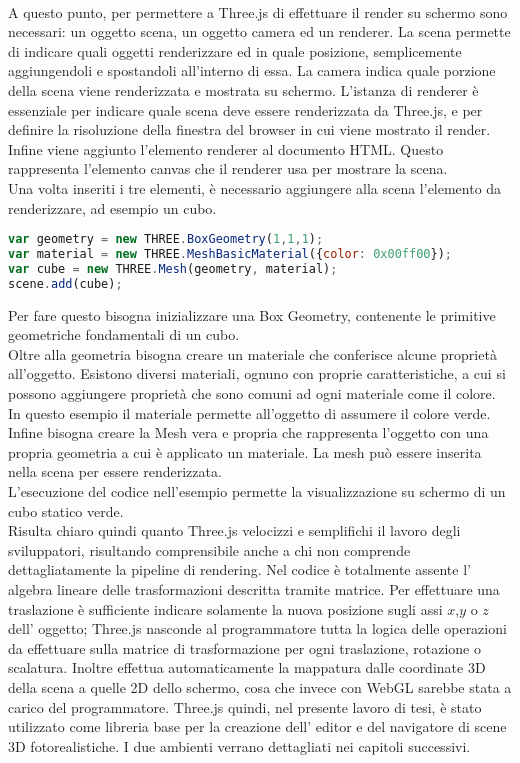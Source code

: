 \\
A questo punto, per permettere a Three.js di effettuare il render su schermo sono necessari: un oggetto scena, un oggetto camera ed un renderer.
La scena permette di indicare quali oggetti renderizzare ed in quale posizione, semplicemente aggiungendoli e spostandoli all’interno di essa.
La camera indica quale porzione della scena viene renderizzata e mostrata su schermo. L’istanza di renderer è essenziale per indicare quale scena deve essere renderizzata da Three.js, e per definire la risoluzione della finestra del browser in cui viene mostrato il render.
\\ 
Infine viene aggiunto l’elemento renderer al documento HTML. Questo rappresenta l’elemento canvas che il renderer usa per mostrare la scena.
\\
Una volta inseriti i tre elementi, è necessario aggiungere alla scena l’elemento da renderizzare, ad esempio un cubo.
\begin{lstlisting}[language=javascript]
var geometry = new THREE.BoxGeometry(1,1,1);
var material = new THREE.MeshBasicMaterial({color: 0x00ff00});
var cube = new THREE.Mesh(geometry, material);
scene.add(cube);
\end{lstlisting}
Per fare questo bisogna inizializzare una Box Geometry, contenente le primitive geometriche fondamentali di un cubo.
\\
Oltre alla geometria bisogna creare un materiale che conferisce alcune proprietà all’oggetto. Esistono diversi materiali, ognuno con proprie caratteristiche, a cui si possono aggiungere proprietà che sono comuni ad ogni materiale come il colore. In questo esempio il materiale permette all’oggetto di assumere il colore verde.
\\ 
Infine bisogna creare la Mesh vera e propria che rappresenta l’oggetto con una propria geometria a cui è applicato un materiale. La mesh può essere inserita nella scena per essere renderizzata.
\\
L’esecuzione del codice nell’esempio permette la visualizzazione su schermo di un cubo statico verde.
\\
Risulta chiaro quindi quanto Three.js velocizzi e semplifichi il lavoro degli sviluppatori, risultando comprensibile anche a chi non comprende dettagliatamente la pipeline di rendering. Nel codice è totalmente assente l’ algebra lineare delle trasformazioni descritta tramite matrice. Per effettuare una traslazione è sufficiente indicare solamente la nuova posizione sugli assi $x$,$y$ o $z$ dell’ oggetto; Three.js nasconde al programmatore tutta la logica delle operazioni da effettuare sulla matrice di trasformazione per ogni traslazione, rotazione o scalatura. Inoltre effettua automaticamente la mappatura dalle coordinate 3D della scena a quelle 2D dello schermo, cosa che invece con WebGL sarebbe stata a carico del programmatore.
Three.js quindi, nel presente lavoro di tesi, è stato utilizzato come libreria base per la creazione dell’ editor e del navigatore di scene 3D fotorealistiche. I due ambienti verrano dettagliati nei capitoli successivi.
